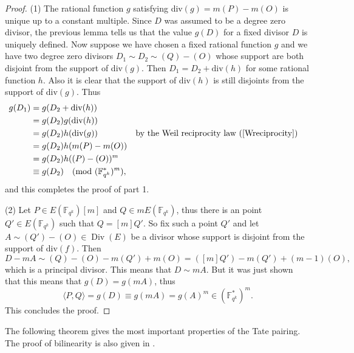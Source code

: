 \documentclass{article}
\numberwithin{equation}{section}
\theoremstyle{definition}
\newcommand{\FF}[1]{{\mathbb F}_{#1}} %
\newcommand{\Div}{\operatorname{Div}} %
\begin{document}
\begin{proof}
(1) The rational function $g$ satisfying div$(g)=m(P)-m(O)$ is unique up to a constant multiple. Since $D$ was assumed to be a degree zero divisor, the previous lemma tells us that the value $g(D)$ for a fixed divisor $D$ is uniquely defined. Now suppose we have chosen a fixed rational function $g$ and we have two degree zero divisors $D_1 \sim D_2 \sim (Q)-(O)$ whose support are both disjoint from the support of div$(g)$. Then $D_1=D_2+\text{div}(h)$ for some rational function $h$. Also it is clear that the support of div$(h)$ is still disjoints from the support of div$(g)$. Thus 
\begin{align*}
g(D_1) &= g(D_2+\text{div}(h)) \\
&= g(D_2)g(\text{div}(h)) \\
&= g(D_2)h(\text{div}(g)) &&\text{by the Weil reciprocity law (\ref{Wreciprocity})}\\
&= g(D_2)h(m(P)-m(O)) \\
&= g(D_2) h((P)-(O))^m \\
&\equiv g(D_2) \quad (\text{mod } (\FF{q^k}^*)^m),
\end{align*}
and this completes the proof of part 1. \par
(2) Let $P \in E(\FF{q^k})[m]$ and $Q \in mE(\FF{q^k})$, thus there is an point $Q'\in E(\FF{q^k})$ such that $Q=[m]Q'$. So fix such a point $Q'$ and let $A \sim (Q') - (O) \in \Div(E)$ be a divisor whose support is disjoint from the support of div$(f)$. Then $$D-mA \sim (Q)-(O)-m(Q') + m(O) = ([m]Q') - m(Q')+(m-1)(O),$$  which is a principal divisor. This means that $D \sim mA$. But it was just shown that this means that $g(D)=g(mA)$, thus $$ \langle P,Q \rangle = g(D) \equiv g(mA) = g(A)^m \in (\FF{q^k}^*)^m.$$ This concludes the proof.
\end{proof}

The following theorem gives the most important properties of the Tate pairing. The proof of bilinearity is also given in \cite[IX.4]{blake2}.
\end{document}
